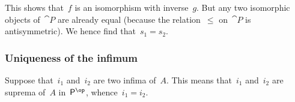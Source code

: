 This shows that~$f$ is an isomorphism with inverse~$g$.
But any two isomorphic objects of~$\cat{P}$ are already equal (because the relation~$≤$ on~$\cat{P}$ is antisymmetric).
We hence find that~$s_1 = s_2$.



\subsubsection*{Uniqueness of the infimum}

Suppose that~$i_1$ and~$i_2$ are two infima of~$A$.
This means that~$i_1$ and~$i_2$ are suprema of~$A$ in~$\cat{P}^{\op}$, whence~$i_1 = i_2$.
